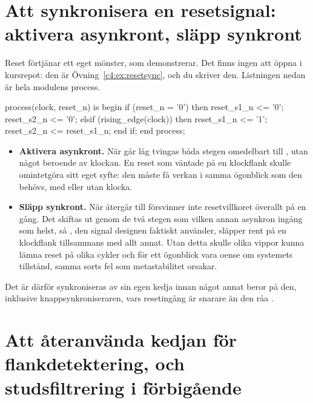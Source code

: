\section{Att synkronisera en resetsignal: aktivera asynkront, släpp synkront}
\label{c4:sec:resetsync}

Reset förtjänar ett eget mönster, som  demonstrerar. Det finns ingen
 att öppna i kursrepot: den är Övning~\ref{c4:ex:resetsync}, och du skriver
den. Listningen nedan är hela modulens process.

\begin{vhdlcode}
process(clock, reset_n) is
begin
    if (reset_n = '0') then
        reset_s1_n <= '0';
        reset_s2_n <= '0';
    elsif (rising_edge(clock)) then
        reset_s1_n <= '1';
        reset_s2_n <= reset_s1_n;
    end if;
end process;
\end{vhdlcode}

\begin{itemize}
  \item \textbf{Aktivera asynkront.} När  går låg tvingas båda stegen omedelbart till
    , utan något beroende av klockan. En reset som väntade på en klockflank skulle
    omintetgöra sitt eget syfte: den måste få verkan i samma ögonblick som den behövs, med eller
    utan klocka.
  \item \textbf{Släpp synkront.} När  återgår till  försvinner inte
    resetvillkoret överallt på en gång. Det skiftas ut genom de två stegen som vilken annan
    asynkron ingång som helst, så , den signal designen faktiskt använder, släpper
    rent på en klockflank tillsammans med allt annat. Utan detta skulle olika vippor kunna lämna
    reset på olika cykler och för ett ögonblick vara oense om systemets tillstånd, samma sorts fel
    som metastabilitet orsakar.
\end{itemize}

Det är därför  synkroniseras av sin egen kedja innan något annat beror på den,
inklusive knappsynkroniseraren, vars resetingång är  snarare än den råa
.

\section{Att återanvända kedjan för flankdetektering, och studsfiltrering i förbigående}
\label{c4:sec:buttonsync}

